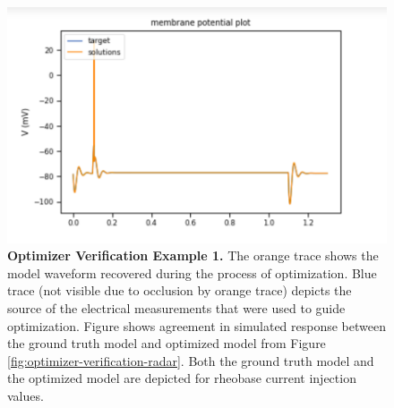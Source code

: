 \begin{figure}
    \centering
    \includegraphics[scale=0.85]{figures/simulated_data_supra_threshold.png}
    \caption[Optimizer Verification Example 1]{\textbf{Optimizer Verification Example 1.} The orange trace shows the model waveform recovered during the process of optimization. Blue trace (not visible due to occlusion by orange trace) depicts the source of the electrical measurements that were used to guide optimization.
    Figure shows agreement in simulated response between the ground truth model and optimized model from Figure \ref{fig:optimizer-verification-radar}. Both the ground truth model and the optimized model are depicted for rheobase current injection values.}
\label{fig:optimizer-verification-traces-1}
\end{figure}

